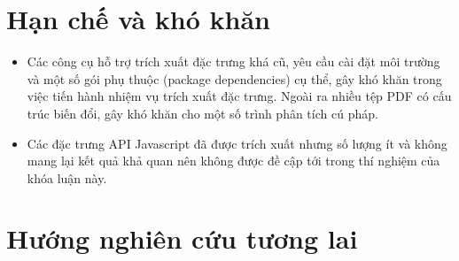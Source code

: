 \documentclass[./../main.tex]{subfiles}
\begin{document}
\section{Hạn chế và khó khăn}

\begin{itemize}
	\item
	      Các công cụ hỗ trợ trích xuất đặc trưng khá cũ, yêu cầu cài đặt môi trường và một số gói phụ thuộc (package dependencies) cụ thể, gây khó khăn trong việc tiến hành nhiệm vụ trích xuất đặc trưng. Ngoài ra nhiều tệp PDF có cấu trúc biến đổi, gây khó khăn cho một số trình phân tích cú pháp.
	\item
	      Các đặc trưng API Javascript đã được trích xuất nhưng số lượng ít và không mang lại kết quả khả quan nên không được đề cập tới trong thí nghiệm của khóa luận này.
\end{itemize}
\section{Hướng nghiên cứu tương lai}
\end{document}
